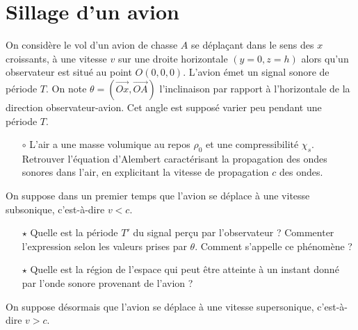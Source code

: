 \documentclass{report}
\begin{document}
\section*{Sillage d'un avion}

On considère le vol d'un avion de chasse $A$ se déplaçant dans le sens des $x$ croissants, à une vitesse $v$ sur une droite horizontale $(y=0,z=h)$ alors qu'un observateur est situé au point $O(0,0,0)$. L'avion émet un signal sonore de période $T$. On note $\theta=(\vec{Ox},\vec{OA})$ l'inclinaison par rapport à l'horizontale de la direction observateur-avion. Cet angle est supposé varier peu pendant une période $T$.

\begin{itemize}

	\item[$\circ$] L'air a une masse volumique au repos $\rho_0$ et une compressibilité $\chi_s$. Retrouver l'équation d'Alembert caractérisant la propagation des ondes sonores dans l'air, en explicitant la vitesse de propagation $c$ des ondes.

\end{itemize}

On suppose dans un premier temps que l'avion se déplace à une vitesse subsonique, c'est-à-dire $v<c$.

\begin{itemize}

	\item[$\star$] Quelle est la période $T'$ du signal perçu par l'observateur ? Commenter l'expression selon les valeurs prises par $\theta$. Comment s'appelle ce phénomène ?
	
	\item[$\star$] Quelle est la région de l'espace qui peut être atteinte à un instant donné par l'onde sonore provenant de l'avion ?

\end{itemize}

On suppose désormais que l'avion se déplace à une vitesse supersonique, c'est-à-dire $v>c$.
\end{document}
